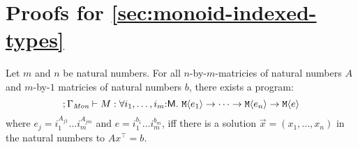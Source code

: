 \section{Proofs for \autoref{sec:monoid-indexed-types}}

\begin{restateTheorem}
  Let $m$ and $n$ be natural numbers. For all $n$-by-$m$-matricies of
  natural numbers $A$ and $m$-by-$1$ matricies of natural numbers $b$,
  there exists a program:
  \begin{equation}
    \label{eq-appendix:fo-monoid-type}
    ; \Gamma_\Mon \vdash M : \forall i_1,\dots,i_m\mathord:\mathsf{M}.\ \tyPrim{M}{e_1} \to \dots \to \tyPrim{M}{e_n} \to \tyPrim{M}{e}
  \end{equation}
  where $e_j = i_1^{A_{j1}}\dots i_m^{A_{jm}}$ and $e = i_1^{b_1}\dots
  i_m^{b_m}$, iff there is a solution $\vec{x} = (x_1,...,x_n)$ in the
  natural numbers to $A x^\top = b$.
\end{restateTheorem}


